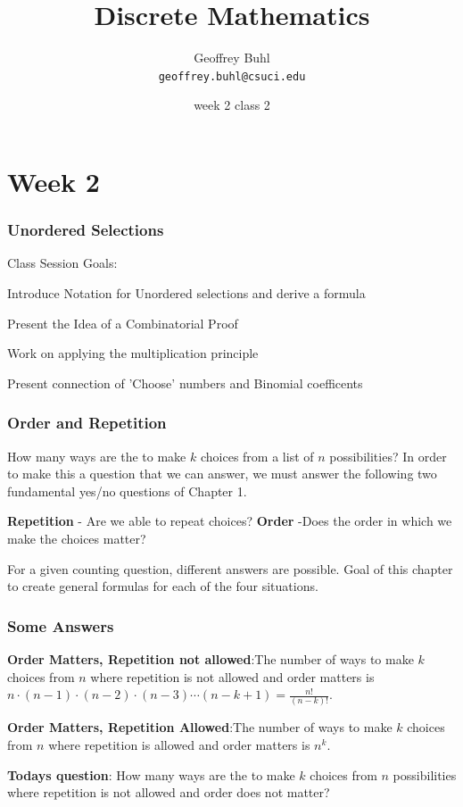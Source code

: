\documentclass{beamer}
\title{Discrete Mathematics}
\author[Geoffrey Buhl]{Geoffrey Buhl \\ \texttt{geoffrey.buhl@csuci.edu}}
\institute[CSUCI]{California State University Channel Islands}
\date{week 2 class 2}
\newenvironment{packed_enum}{
\begin{enumerate}
  \setlength{\itemsep}{1pt}
  \setlength{\parskip}{0pt}
  \setlength{\parsep}{0pt}
}{\end{enumerate}}
\begin{document}


\section{Week 2}
\frame
{
  \frametitle{Unordered Selections}

Class Session Goals:
\begin{packed_enum}
\item Introduce Notation for Unordered selections and derive a formula
\item Present the Idea of a Combinatorial Proof
\item Work on applying the multiplication principle
\item Present connection of 'Choose' numbers and Binomial coefficents
\end{packed_enum}

}


\frame
{
  \frametitle{Order and Repetition}

How many ways are the to make $k$ choices from a list of $n$ possibilities? In order to make this a question that we can answer, we must answer the following two fundamental yes/no questions of Chapter 1. \vfill

{\bf Repetition} -  Are we able to repeat choices?  \vfill
{\bf Order} -Does the order in which we make the choices matter?   \vfill

For a given counting question, different answers are possible.  Goal of this chapter to create general formulas for each of the four situations.

}

\frame
{
  \frametitle{Some Answers}

{\bf Order Matters, Repetition not allowed}:The number of ways to make $k$ choices from $n$ where repetition is not allowed and order matters is $n \cdot (n-1) \cdot (n-2) \cdot (n-3) \cdots (n-k+1)=\frac{n!}{(n-k)!}$.\vfill


{\bf Order Matters, Repetition Allowed}:The number of ways to make $k$ choices from $n$ where repetition is allowed and order matters is $n^k$. \vfill

{\bf Todays question}:  How many ways are the to make $k$ choices from $n$ possibilities where repetition is not allowed and order does not matter?


}
\end{document}
